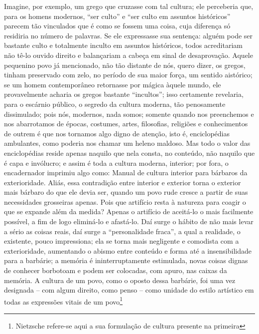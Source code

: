 \begin{enumerate}
\begin{enumerate}
    Imagine, por exemplo, um grego que cruzasse com tal cultura; ele
    perceberia que, para os homens modernos, ``ser culto'' e ``ser culto
    em assuntos históricos'' parecem tão vinculados que é como se fossem
    uma coisa, cuja diferença só residiria no número de palavras. Se ele
    expressasse sua sentença: alguém pode ser bastante culto e
    totalmente inculto em assuntos históricos, todos acreditariam não
    tê-lo ouvido direito e balançariam a cabeça em sinal de
    desaprovação. Aquele pequenino povo já mencionado, não tão distante
    de nós, quero dizer, os gregos, tinham preservado com zelo, no
    período de sua maior força, um sentido aistórico; se um homem
    contemporâneo retornasse por mágica àquele mundo, ele provavelmente
    acharia os gregos bastante ``incultos''; isso certamente revelaria,
    para o escárnio público, o segredo da cultura moderna, tão
    penosamente dissimulado; pois nós, modernos, nada somos; somente
    quando nos preenchemos e nos abarrotamos de épocas, costumes, artes,
    filosofias, religiões e conhecimentos de outrem é que nos tornamos
    algo digno de atenção, isto é, enciclopédias ambulantes, como
    poderia nos chamar um heleno maldoso. Mas todo o valor das
    enciclopédias reside apenas naquilo que nela consta, no conteúdo,
    não naquilo que é capa e invólucro; e assim é toda a cultura
    moderna, interior; por fora, o encadernador imprimiu algo como:
    Manual de cultura interior para bárbaros da exterioridade. Aliás,
    essa contradição entre interior e exterior torna o exterior mais
    bárbaro do que ele devia ser, quando um povo rude cresce a partir de
    suas necessidades grosseiras apenas. Pois que artifício resta à
    natureza para coagir o que se expande além da medida? Apenas o
    artifício de aceitá-lo o mais facilmente possível, a fim de logo
    eliminá-lo e afastá-lo. Daí surge o hábito de não mais levar a sério
    as coisas reais, daí surge a ``personalidade fraca'', a qual a
    realidade, o existente, pouco impressiona; ela se torna mais
    negligente e comodista com a exterioridade, aumentando o abismo
    entre conteúdo e forma até a insensibilidade para a barbárie; a
    memória é ininterruptamente estimulada, novas coisas dignas de
    conhecer borbotoam e podem ser colocadas, com apuro, nas caixas da
    memória. A cultura de um povo, como o oposto dessa barbárie, foi uma
    vez designada -- com algum direito, como penso -- como unidade do
    estilo artístico em todas as expressões vitais de um povo\footnote{Nietzsche
      refere-se aqui a sua formulação de cultura presente na primeira
}
\end{enumerate}
\end{enumerate}
